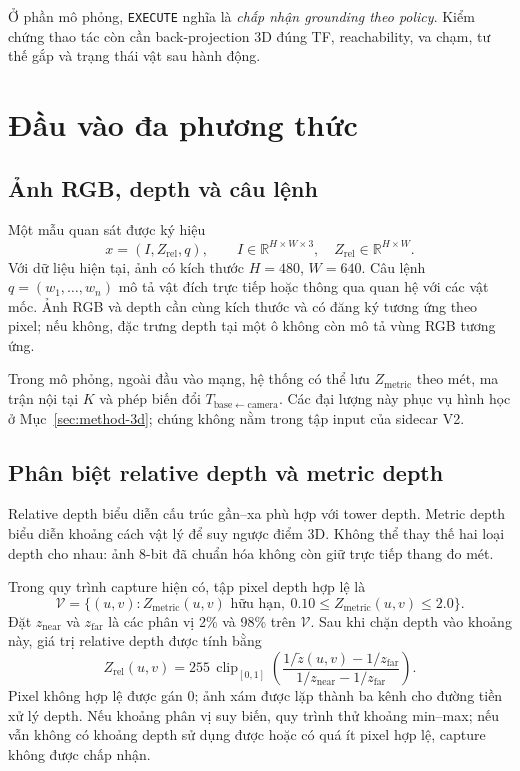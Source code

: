 Ở phần mô phỏng, \texttt{EXECUTE} nghĩa là \emph{chấp nhận grounding theo
policy}. Kiểm chứng thao tác còn cần back-projection 3D đúng TF,
reachability, va chạm, tư thế gắp và trạng thái vật sau hành động.

\section{Đầu vào đa phương thức}
\label{sec:method-input}

\subsection{Ảnh RGB, depth và câu lệnh}

Một mẫu quan sát được ký hiệu
\begin{equation}
    x=(I,Z_{\mathrm{rel}},q),\qquad
    I\in\mathbb{R}^{H\times W\times3},\quad
    Z_{\mathrm{rel}}\in\mathbb{R}^{H\times W}.
\end{equation}
Với dữ liệu hiện tại, ảnh có kích thước $H=480$, $W=640$.
Câu lệnh $q=(w_1,\ldots,w_n)$ mô tả vật đích trực tiếp hoặc thông qua
quan hệ với các vật mốc. Ảnh RGB và depth cần cùng kích thước và có
đăng ký tương ứng theo pixel; nếu không, đặc trưng depth tại một ô
không còn mô tả vùng RGB tương ứng.

Trong mô phỏng, ngoài đầu vào mạng, hệ thống có thể lưu
$Z_{\mathrm{metric}}$ theo mét, ma trận nội tại $K$ và phép biến đổi
$T_{\mathrm{base}\leftarrow\mathrm{camera}}$.
Các đại lượng này phục vụ hình học ở Mục~\ref{sec:method-3d};
chúng không nằm trong tập input của sidecar V2.

\subsection{Phân biệt relative depth và metric depth}

Relative depth biểu diễn cấu trúc gần--xa phù hợp với tower depth.
Metric depth biểu diễn khoảng cách vật lý để suy ngược điểm 3D.
Không thể thay thế hai loại depth cho nhau: ảnh 8-bit đã chuẩn hóa
không còn giữ trực tiếp thang đo mét.

Trong quy trình capture hiện có, tập pixel depth hợp lệ là
\begin{equation}
    \mathcal{V}=\{(u,v): Z_{\mathrm{metric}}(u,v)
    \text{ hữu hạn},\ 0.10\leq Z_{\mathrm{metric}}(u,v)\leq2.0\}.
\end{equation}
Đặt $z_{\mathrm{near}}$ và $z_{\mathrm{far}}$ là các phân vị 2\% và
98\% trên $\mathcal{V}$. Sau khi chặn depth vào khoảng này, giá trị
relative depth được tính bằng
\begin{equation}
    Z_{\mathrm{rel}}(u,v)=255\,
    \operatorname{clip}_{[0,1]}
    \left(
    \frac{1/\widetilde{z}(u,v)-1/z_{\mathrm{far}}}
         {1/z_{\mathrm{near}}-1/z_{\mathrm{far}}}
    \right).
    \label{eq:method-relative-depth}
\end{equation}
Pixel không hợp lệ được gán 0; ảnh xám được lặp thành ba kênh cho
đường tiền xử lý depth. Nếu khoảng phân vị suy biến, quy trình thử
khoảng min--max; nếu vẫn không có khoảng depth sử dụng được hoặc có
quá ít pixel hợp lệ, capture không được chấp nhận.

